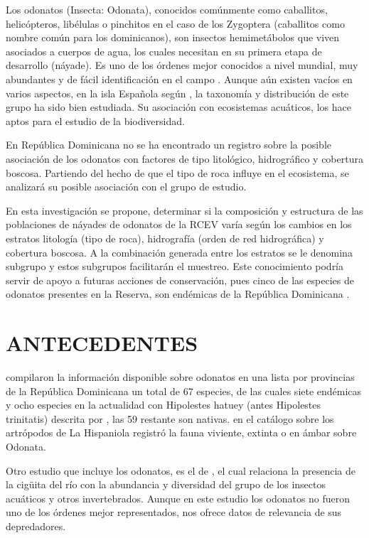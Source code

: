 \documentclass[12pt,letterpaper,spanish]{article}
\begin{document}
Los odonatos (Insecta: Odonata), conocidos comúnmente como caballitos, helicópteros, libélulas o pinchitos en el caso de los Zygoptera (caballitos como nombre común para los dominicanos), son insectos hemimetábolos que viven asociados a cuerpos de agua, los cuales necesitan en su primera etapa de desarrollo (náyade). Es uno de los órdenes mejor conocidos a nivel mundial, muy abundantes y de fácil identificación en el campo \citep{ramirez2010capitulo}. Aunque aún existen vacíos en varios aspectos, en la isla Española según \citet{bastardo2017estado}, la taxonomía y distribución de este grupo ha sido bien estudiada. Su asociación con ecosistemas acuáticos, los hace aptos para el estudio de la biodiversidad.

En República Dominicana no se ha encontrado un registro sobre la posible asociación de los odonatos con factores de tipo litológico, hidrográfico y cobertura boscosa. Partiendo del hecho de que el tipo de roca influye en el ecosistema, se analizará su posible asociación con el grupo de estudio.

En esta investigación se propone, determinar si la composición y estructura de las poblaciones de náyades de odonatos de la RCEV varía según los cambios en los estratos litología (tipo de roca), hidrografía (orden de red hidrográfica) y cobertura boscosa. A la combinación generada entre los estratos se le denomina subgrupo \citep{triola2009estadistica, rojas2000investigar} y estos subgrupos facilitarán el muestreo. Este conocimiento podría servir de apoyo a futuras acciones de conservación, pues cinco de las especies de odonatos presentes en la Reserva, son endémicas de la República Dominicana \citep{flint2006distribution, perez2015entomofauna}.

\newpage
\section*{ANTECEDENTES}

\citet{flint2006distribution} compilaron la información disponible sobre odonatos en una lista por provincias de la República Dominicana un total de 67 especies, de las cuales siete endémicas y ocho especies en la actualidad con Hipolestes hatuey (antes Hipolestes trinitatis) descrita por \citet{torres2015hypolestes}, las 59 restante son nativas. \citet{perez2008arthropods} en el catálogo sobre los artrópodos de La Hispaniola registró la fauna viviente, extinta o en ámbar sobre Odonata.

Otro estudio que incluye los odonatos, es el de \citet{almonte2012caracterizacion}, el cual relaciona la presencia de la cigüita del río con la abundancia y diversidad del grupo de los insectos acuáticos y otros invertebrados. Aunque en este estudio los odonatos no fueron uno de los órdenes mejor representados, nos ofrece datos de relevancia de sus depredadores.
\end{document}
